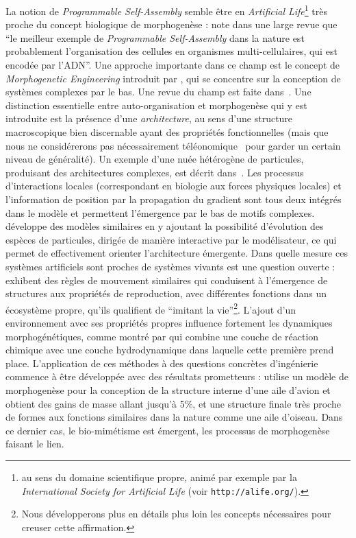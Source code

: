 {La notion de \emph{Programmable Self-Assembly} semble être en \emph{Artificial Life}\footnote{au sens du domaine scientifique propre, animé par exemple par la \emph{International Society for Artificial Life} (voir \texttt{http://alife.org/}).} très proche du concept biologique de morphogenèse : \cite{crosato2014self} note dans une large revue que ``le meilleur exemple de \emph{Programmable Self-Assembly} dans la nature est probablement l'organisation des cellules en organismes multi-cellulaires, qui est encodée par l'ADN''. Une approche importante dans ce champ est le concept de \emph{Morphogenetic Engineering} introduit par , qui se concentre sur la conception de systèmes complexes par le bas. Une revue du champ est faite dans~\cite{doursat2013review}. Une distinction essentielle entre auto-organisation et morphogenèse qui y est introduite est la présence d'une \emph{architecture}, au sens d'une structure macroscopique bien discernable ayant des propriétés fonctionnelles (mais que nous ne considérerons pas nécessairement téléonomique~\cite{monod1970hasard} pour garder un certain niveau de généralité). Un exemple d'une nuée hétérogène de particules, produisant des architectures complexes, est décrit dans~\cite{doursat2008programmable}. Les processus d'interactions locales (correspondant en biologie aux forces physiques locales) et l'information de position par la propagation du gradient sont tous deux intégrés dans le modèle et permettent l'émergence par le bas de motifs complexes. \cite{sayama2009swarm} développe des modèles similaires en y ajoutant la possibilité d'évolution des espèces de particules, dirigée de manière interactive par le modélisateur, ce qui permet de effectivement orienter l'architecture émergente. Dans quelle mesure ces systèmes artificiels sont proches de systèmes vivants est une question ouverte : \cite{Schmickl_2016} exhibent des règles de mouvement similaires qui conduisent à l'émergence de structures aux propriétés de reproduction, avec différentes fonctions dans un écosystème propre, qu'ils qualifient de ``imitant la vie''\footnote{Nous développerons plus en détails plus loin les concepts nécessaires pour creuser cette affirmation.}. L'ajout d'un environnement avec ses propriétés propres influence fortement les dynamiques morphogénétiques, comme montré par \cite{cussat2012synthesis} qui combine une couche de réaction chimique avec une couche hydrodynamique dans laquelle cette première prend place. L'application de ces méthodes à des questions concrètes d'ingénierie commence à être développée avec des résultats prometteurs : \cite{Aage:2017aa} utilise un modèle de morphogenèse pour la conception de la structure interne d'une aile d'avion et obtient des gains de masse allant jusqu'à 5\%, et une structure finale très proche de formes aux fonctions similaires dans la nature comme une aile d'oiseau. Dans ce dernier cas, le bio-mimétisme est émergent, les processus de morphogenèse faisant le lien.
}



